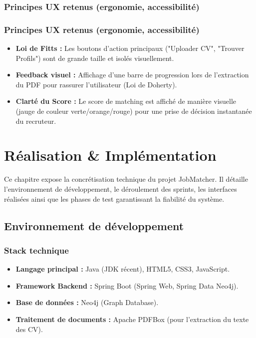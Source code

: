 \documentclass[12pt,a4paper]{report}
\begin{document}
\subsection{Principes UX retenus (ergonomie, accessibilité)}
\begin{itemize}
\subsection{Principes UX retenus (ergonomie, accessibilité)}
\begin{itemize}
    \item \textbf{Loi de Fitts :} Les boutons d'action principaux ("Uploader CV", "Trouver Profils") sont de grande taille et isolés visuellement.
    \item \textbf{Feedback visuel :} Affichage d'une barre de progression lors de l'extraction du PDF pour rassurer l'utilisateur (Loi de Doherty).
    \item \textbf{Clarté du Score :} Le score de matching est affiché de manière visuelle (jauge de couleur verte/orange/rouge) pour une prise de décision instantanée du recruteur.
\end{itemize}

\chapter{Réalisation \& Implémentation}

Ce chapitre expose la concrétisation technique du projet JobMatcher. Il détaille l'environnement de développement, le déroulement des sprints, les interfaces réalisées ainsi que les phases de test garantissant la fiabilité du système.

\section{Environnement de développement}

\subsection{Stack technique}
\begin{itemize}
    \item \textbf{Langage principal :} Java (JDK récent), HTML5, CSS3, JavaScript.
    \item \textbf{Framework Backend :} Spring Boot (Spring Web, Spring Data Neo4j).
    \item \textbf{Base de données :} Neo4j (Graph Database).
    \item \textbf{Traitement de documents :} Apache PDFBox (pour l'extraction du texte des CV).
\end{itemize}


\end{itemize}
\end{document}
